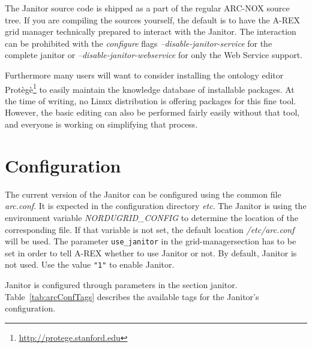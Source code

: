 The Janitor source code is shipped as a part of the regular ARC-NOX
source tree.  If you are compiling the sources yourself, the default
is to have the A-REX grid manager technically prepared to interact
with the Janitor.
The interaction can be prohibited
with the \textit{configure} flags \textit{--disable-janitor-service}
for the complete janitor or \textit{--disable-janitor-webservice} for
only the Web Service support.

Furthermore many users will want to consider installing the ontology editor 
Prot\`eg\`e\footnote{\href{http://protege.stanford.edu}{http://protege.stanford.edu}}
to easily maintain the knowledge database of installable
packages.  At the time of writing, no Linux distribution is offering
packages for this fine tool. However, the basic editing can also be
performed fairly easily without that tool, and everyone is working on
simplifying that process.


\section{Configuration}\label{sec:janitorConfiguration}

The current version of the Janitor can be configured using the
common file \textit{arc.conf}. It is expected in the configuration
directory \textit{etc}. The Janitor is using the environment
variable \textit{NORDUGRID\_CONFIG} to determine the location of the
corresponding file. If that variable is not set, the default location
\textit{/etc/arc.conf} will be used.  The parameter \texttt{use_janitor} in the
\lbrack grid-manager\rbrack section has to be set in order to tell A-REX
whether to use Janitor or not. By default, Janitor is not used. Use the value
\texttt{"1"} to enable Janitor.

Janitor is configured through parameters
in the section \lbrack janitor\rbrack. Table~\ref{tab:arcConfTags}
describes the available tags for the Janitor's configuration.

